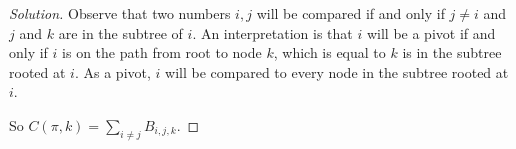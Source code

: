 \begin{proof}[Solution]
	Observe that two numbers $i,j$ will be compared if and only if $j\ne i$ and $j$ and $k$ are in the subtree of $i$. An interpretation is that $i$ will be a pivot if and only if $i$ is on the path from root to node $k$, which is equal to $k$ is in the subtree rooted at $i$. As a pivot, $i$ will be compared to every node in the subtree rooted at $i$.
	
	So $C(\pi,k)=\sum_{i\ne j}B_{i,j,k}$.
\end{proof}





